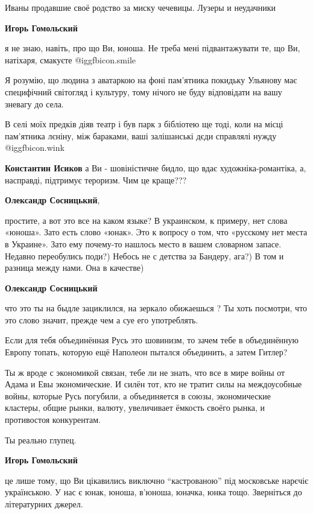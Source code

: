 \begin{itemize}
\begin{itemize}
Иваны продавшие своё родство за миску чечевицы.
Лузеры и неудачники

\textbf{Игорь Гомольский} 

я не знаю, навіть, про що Ви, юноша. Не треба мені підвантажувати те, що Ви,
натіхаря, смакуєте  @igg{fbicon.smile} 

Я розумію, що людина з аватаркою на фоні пам'ятника покидьку Ульянову має
специфічний світогляд і культуру, тому нічого не буду відповідати на вашу
зневагу до села.

В селі моїх предків діяв театр і був парк з бібліотею ще тоді, коли на місці
пам'ятника лєніну, між бараками, ваші залішанські дєди справлялі нужду  @igg{fbicon.wink} 

\textbf{Константин Исиков} а Ви - шовіністичне бидло, що вдає художніка-романтіка, а, насправді, підтримує тероризм. Чим це краще???

\textbf{Олександр Сосницький}, 

простите, а вот это все на каком языке? В украинском, к примеру, нет слова
«юноша». Зато есть слово «юнак». Это к вопросу о том, что «русскому нет места в
Украине». Зато ему почему-то нашлось место в вашем словарном запасе. Недавно
переобулись поди?) Небось не с детства за Бандеру, ага?) В том и разница между
нами. Она в качестве)

\textbf{Олександр Сосницький} 

что это ты на быдле зациклился, на зеркало обижаешься ? Ты хоть посмотри, что
это слово значит, прежде чем а суе его употреблять.

Если для тебя объединённая Русь это шовинизм, то зачем тебе в объединённую
Европу топать, которую ещё Наполеон пытался объединить, а затем Гитлер?

Ты ж вроде с экономикой связан, тебе ли не знать, что все в мире войны от Адама
и Евы экономические. И силён тот, кто не тратит силы на междоусобные войны,
которые Русь погубили, а объединяется в союзы, экономические кластеры, общие
рынки, валюту, увеличивает ёмкость своёго рынка, и противостоя конкурентам.

Ты реально глупец.

\textbf{Игорь Гомольский} 

це лише тому, що Ви цікавились виключно \enquote{кастрованою} під московське нарєчіє
українською. У нас є юнак, юноша, в'юноша, юначка, юнка тощо. Зверніться до
літературних джерел.


\end{itemize}
\end{itemize}
